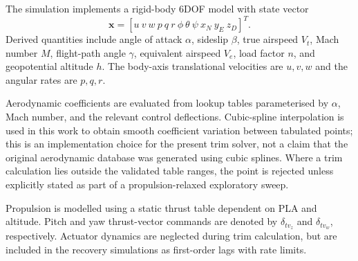 \documentclass[conf]{new-aiaa}
\begin{document}
The simulation implements a rigid-body 6DOF model with state vector
\[
\mathbf{x} = [u\ v\ w\ p\ q\ r\ \phi\ \theta\ \psi\ x_N\ y_E\ z_D]^T.
\]
Derived quantities include angle of attack $\alpha$, sideslip $\beta$, true airspeed $V_t$, Mach number $M$, flight-path angle $\gamma$, equivalent airspeed $V_e$, load factor $n$, and geopotential altitude $h$. The body-axis translational velocities are $u,v,w$ and the angular rates are $p,q,r$.

Aerodynamic coefficients are evaluated from lookup tables parameterised by $\alpha$, Mach number, and the relevant control deflections. Cubic-spline interpolation is used in this work to obtain smooth coefficient variation between tabulated points; this is an implementation choice for the present trim solver, not a claim that the original aerodynamic database was generated using cubic splines. Where a trim calculation lies outside the validated table ranges, the point is rejected unless explicitly stated as part of a propulsion-relaxed exploratory sweep.

Propulsion is modelled using a static thrust table dependent on PLA and altitude. Pitch and yaw thrust-vector commands are denoted by $\delta_{tv_z}$ and $\delta_{tv_w}$, respectively. Actuator dynamics are neglected during trim calculation, but are included in the recovery simulations as first-order lags with rate limits.
\end{document}
